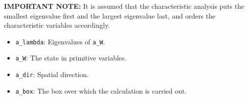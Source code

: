 \begin{itemize}
{\bf IMPORTANT NOTE:} It is assumed that the characteristic analysis puts the
smallest eigenvalue first and the largest eigenvalue last, and orders the
characteristic variables accordingly.
\begin{itemize}
\item \verb/a_lambda/:  Eigenvalues of \verb/a_W/.
\vspace{-0.07in}
\item \verb/a_W/:  The state in primitive variables.
\vspace{-0.07in}
\item \verb/a_dir/: Spatial direction.
\vspace{-0.07in}
\item \verb/a_box/:  The box over which the calculation is carried out.
\end{itemize}


\end{itemize}

